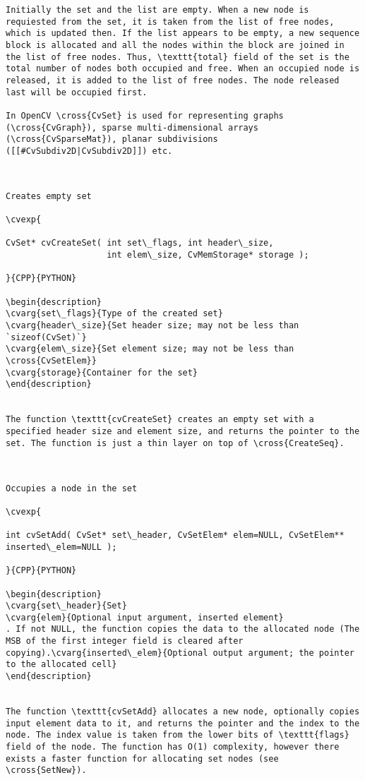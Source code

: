 \begin{verbatim}
Initially the set and the list are empty. When a new node is requiested from the set, it is taken from the list of free nodes, which is updated then. If the list appears to be empty, a new sequence block is allocated and all the nodes within the block are joined in the list of free nodes. Thus, \texttt{total} field of the set is the total number of nodes both occupied and free. When an occupied node is released, it is added to the list of free nodes. The node released last will be occupied first.

In OpenCV \cross{CvSet} is used for representing graphs (\cross{CvGraph}), sparse multi-dimensional arrays (\cross{CvSparseMat}), planar subdivisions ([[#CvSubdiv2D|CvSubdiv2D]]) etc.


\end{verbatim}
\begin{verbatim}

Creates empty set

\cvexp{

CvSet* cvCreateSet( int set\_flags, int header\_size,
                    int elem\_size, CvMemStorage* storage );

}{CPP}{PYTHON}

\begin{description}
\cvarg{set\_flags}{Type of the created set}
\cvarg{header\_size}{Set header size; may not be less than `sizeof(CvSet)`}
\cvarg{elem\_size}{Set element size; may not be less than \cross{CvSetElem}}
\cvarg{storage}{Container for the set}
\end{description}


The function \texttt{cvCreateSet} creates an empty set with a specified header size and element size, and returns the pointer to the set. The function is just a thin layer on top of \cross{CreateSeq}.


\end{verbatim}
\begin{verbatim}

Occupies a node in the set

\cvexp{

int cvSetAdd( CvSet* set\_header, CvSetElem* elem=NULL, CvSetElem** inserted\_elem=NULL );

}{CPP}{PYTHON}

\begin{description}
\cvarg{set\_header}{Set}
\cvarg{elem}{Optional input argument, inserted element}
. If not NULL, the function copies the data to the allocated node (The MSB of the first integer field is cleared after copying).\cvarg{inserted\_elem}{Optional output argument; the pointer to the allocated cell}
\end{description}


The function \texttt{cvSetAdd} allocates a new node, optionally copies input element data to it, and returns the pointer and the index to the node. The index value is taken from the lower bits of \texttt{flags} field of the node. The function has O(1) complexity, however there exists a faster function for allocating set nodes (see \cross{SetNew}).


\end{verbatim}
